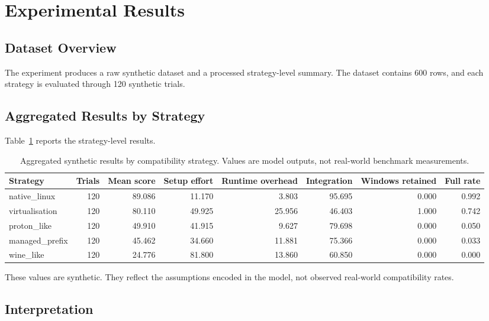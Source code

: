 \documentclass[conference]{IEEEtran}
\begin{document}
\section{Experimental Results}

\subsection{Dataset Overview}

The experiment produces a raw synthetic dataset and a processed strategy-level summary. The dataset contains 600 rows, and each strategy is evaluated through 120 synthetic trials.

\subsection{Aggregated Results by Strategy}

Table~\ref{tab:aggregated-results} reports the strategy-level results.

\begin{table}[t]
\centering
\caption{Aggregated synthetic results by compatibility strategy. Values are model outputs, not real-world benchmark measurements.}
\label{tab:aggregated-results}
\begin{tabular}{lrrrrrrr}
\toprule
Strategy & Trials & Mean score & Setup effort & Runtime overhead & Integration & Windows retained & Full rate \\
\midrule
native\_linux   & 120 & 89.086 & 11.170 &  3.803 & 95.695 & 0.000 & 0.992 \\
virtualisation & 120 & 80.110 & 49.925 & 25.956 & 46.403 & 1.000 & 0.742 \\
proton\_like   & 120 & 49.910 & 41.915 &  9.627 & 79.698 & 0.000 & 0.050 \\
managed\_prefix & 120 & 45.462 & 34.660 & 11.881 & 75.366 & 0.000 & 0.033 \\
wine\_like     & 120 & 24.776 & 81.800 & 13.860 & 60.850 & 0.000 & 0.000 \\
\bottomrule
\end{tabular}
\end{table}

These values are synthetic. They reflect the assumptions encoded in the model, not observed real-world compatibility rates.

\subsection{Interpretation}
\end{document}
